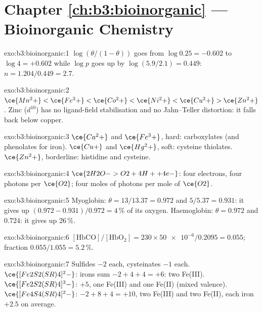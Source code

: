 \section*{Chapter \ref{ch:b3:bioinorganic} --- Bioinorganic Chemistry}

\begin{solution}{exo:b3:bioinorganic:1}
$\log(\theta/(1 - \theta))$ goes from $\log 0.25 = -0.602$ to $\log 4 = +0.602$ while $\log p$ goes up by
$\log(5.9/2.1) = 0.449$: $n = 1.204/0.449 = 2.7$.
\end{solution}

\begin{solution}{exo:b3:bioinorganic:2}
$\ce{Mn^2+} < \ce{Fe^2+} < \ce{Co^2+} < \ce{Ni^2+} < \ce{Cu^2+} > \ce{Zn^2+}$. Zinc ($d^{10}$) has no ligand-field stabilisation and no
Jahn--Teller distortion: it falls back below copper.
\end{solution}

\begin{solution}{exo:b3:bioinorganic:3}
$\ce{Ca^2+}$ and $\ce{Fe^3+}$, hard: carboxylates (and phenolates for iron). $\ce{Cu+}$ and $\ce{Hg^2+}$, soft:
cysteine thiolates. $\ce{Zn^2+}$, borderline: histidine and cysteine.
\end{solution}

\begin{solution}{exo:b3:bioinorganic:4}
$\ce{2H2O -> O2 + 4H+ + 4e-}$: four electrons, four photons per $\ce{O2}$; four moles of photons per
mole of $\ce{O2}$.
\end{solution}

\begin{solution}{exo:b3:bioinorganic:5}
Myoglobin: $\theta = 13/13.37 = 0.972$ and $5/5.37 = 0.931$: it gives up $(0.972 - 0.931)/0.972 = 4$\,\% of its
oxygen. Haemoglobin: $\theta = 0.972$ and $0.724$: it gives up 26\,\%.
\end{solution}

\begin{solution}{exo:b3:bioinorganic:6}
$[\mathrm{HbCO}]/[\mathrm{HbO_2}] = 230 \times \num{50e-6}/0.2095 = 0.055$; fraction $0.055/1.055 = 5.2$\,\%.
\end{solution}

\begin{solution}{exo:b3:bioinorganic:7}
Sulfides $-2$ each, cysteinates $-1$ each. $\ce{[Fe2S2(SR)4]^2-}$: irons sum $-2 + 4 + 4 = +6$: two
Fe(III). $\ce{[Fe2S2(SR)4]^3-}$: $+5$, one Fe(III) and one Fe(II) (mixed valence). $\ce{[Fe4S4(SR)4]^2-}$:
$-2 + 8 + 4 = +10$, two Fe(III) and two Fe(II), each iron $+2.5$ on average.
\end{solution}

